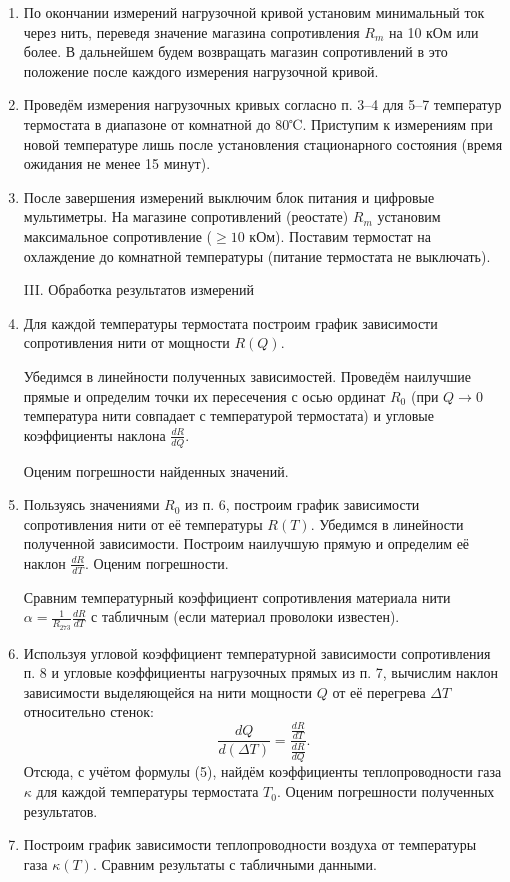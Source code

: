 \documentclass[a4paper,12pt]{article} %
\begin{document}
\begin{enumerate}
    \item По окончании измерений нагрузочной кривой установим минимальный ток через нить, переведя значение магазина сопротивления $R_m$ на 10 кОм или более. В дальнейшем будем возвращать магазин сопротивлений в это положение после каждого измерения нагрузочной кривой.
    \item Проведём измерения нагрузочных кривых согласно п. 3–4 для 5–7 температур термостата в диапазоне от комнатной до 80℃. Приступим к измерениям при новой температуре лишь после установления стационарного состояния (время ожидания не менее 15 минут).
    \item После завершения измерений выключим блок питания и цифровые мультиметры. На магазине сопротивлений (реостате) $R_m$ установим максимальное сопротивление ($\geq 10$ кОм). Поставим термостат на охлаждение до комнатной температуры (питание термостата не выключать).

\begin{center}
  \textsf{III. Обработка результатов измерений}
\end{center}

    \item Для каждой температуры термостата построим график зависимости сопротивления нити от мощности $R(Q)$. 
    
    Убедимся в линейности полученных зависимостей. Проведём наилучшие прямые и определим точки их пересечения с осью ординат $R_0$ (при $Q \to 0$ температура нити совпадает с температурой термостата) и угловые коэффициенты наклона $\frac{dR}{dQ}$. 
    
    Оценим погрешности найденных значений.
    \item Пользуясь значениями $R_0$ из п. 6, построим график зависимости сопротивления нити от её температуры $R(T)$. Убедимся в линейности полученной зависимости. Построим наилучшую прямую и определим её наклон $\frac{dR}{dT}$. Оценим погрешности.
    
    Сравним температурный коэффициент сопротивления материала нити $\alpha = \frac{1}{R_{273}} \frac{dR}{dT}$ с табличным (если материал проволоки известен).
    \item Используя угловой коэффициент температурной зависимости сопротивления п. 8 и угловые коэффициенты нагрузочных прямых из п. 7, вычислим наклон зависимости выделяющейся на нити мощности $Q$ от её перегрева $\Delta T$ относительно стенок:
    \[
    \frac{dQ}{d(\Delta T)} = \frac{\frac{dR}{dT}}{\frac{dR}{dQ}}.
    \]
    Отсюда, с учётом формулы (5), найдём коэффициенты теплопроводности газа $\kappa$ для каждой температуры термостата $T_0$. Оценим погрешности полученных результатов.
    \item Построим график зависимости теплопроводности воздуха от температуры газа $\kappa(T)$. Сравним результаты с табличными данными.
    

\end{enumerate}
\end{document}
